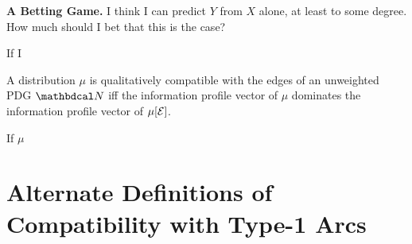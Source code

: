 \documentclass{article}
\begin{document}
\textbf{A Betting Game.} 
I think I can predict $Y$ from $X$ alone, at least to some degree.
How much should I bet that this is the case?

If I 


\begin{conj}
    A distribution $\mu$ is qualitatively compatible with the edges of an unweighted PDG $\dg N$ iff 
    the information profile vector of $\mu$ dominates the information profile vector of $\mu[\mathcal E]$. 
\end{conj}
\begin{conj}
    If $\mu$ 
\end{conj}


\appendix
\clearpage
\section{Alternate Definitions of Compatibility with Type-1 Arcs}
\end{document}
